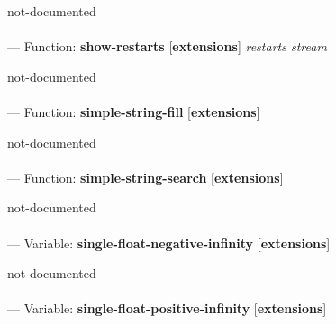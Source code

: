 \begin{adjustwidth}{5em}{5em}
not-documented
\end{adjustwidth}

\paragraph{}
\label{EXTENSIONS:SHOW-RESTARTS}
--- Function: \textbf{show-restarts} [\textbf{extensions}] \textit{restarts stream}

\begin{adjustwidth}{5em}{5em}
not-documented
\end{adjustwidth}

\paragraph{}
\label{EXTENSIONS:SIMPLE-STRING-FILL}
--- Function: \textbf{simple-string-fill} [\textbf{extensions}] \textit{}

\begin{adjustwidth}{5em}{5em}
not-documented
\end{adjustwidth}

\paragraph{}
\label{EXTENSIONS:SIMPLE-STRING-SEARCH}
--- Function: \textbf{simple-string-search} [\textbf{extensions}] \textit{}

\begin{adjustwidth}{5em}{5em}
not-documented
\end{adjustwidth}

\paragraph{}
\label{EXTENSIONS:SINGLE-FLOAT-NEGATIVE-INFINITY}
--- Variable: \textbf{single-float-negative-infinity} [\textbf{extensions}] \textit{}

\begin{adjustwidth}{5em}{5em}
not-documented
\end{adjustwidth}

\paragraph{}
\label{EXTENSIONS:SINGLE-FLOAT-POSITIVE-INFINITY}
--- Variable: \textbf{single-float-positive-infinity} [\textbf{extensions}] \textit{}

